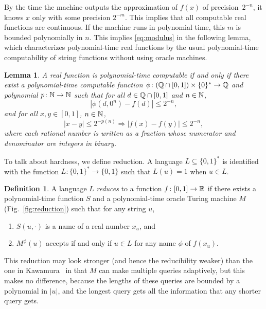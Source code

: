 \documentclass{article}
\newtheorem{lemma}[theorem]{Lemma}
\theoremstyle{definition}
\newtheorem{definition}[theorem]{Definition}
\theoremstyle{remark}
\begin{document}
By the time the machine outputs the approximation of $f (x)$ of precision~$2 ^{-n}$, 
it knows $x$ only with some precision $2 ^{-m}$.
This implies that all computable real functions are continuous.
If the machine runs in polynomial time,
this $m$ is bounded polynomially in $n$.
This implies \eqref{eq:modulus} in the following lemma, 
which characterizes polynomial-time real functions
by the usual polynomial-time computability of string functions 
without using oracle machines. 

\begin{lemma}
 \label{lem:type1representation}
 A real function is polynomial-time computable if and only if
 there exist a polynomial-time computable function 
 $\phi \colon (\mathbb Q \cap [0, 1]) \times \{0\} ^* \to \mathbb Q$ and 
 polynomial $p \colon \mathbb N \to \mathbb N$ such that
 for all $d \in \mathbb Q \cap [0,1]$ and $n \in \mathbb N$,
 \begin{equation}
  |\phi(d, 0^n) - f(d)| \le 2^{-n},
 \end{equation}
 and for all $x, y \in [0, 1]$, $n \in \mathbb N$,
 \begin{equation} 
  |x-y| \le 2^{-p(n)} \Rightarrow |f(x) - f(y)| \le 2^{-n},
   \label{eq:modulus}
 \end{equation}
where each rational number is written
as a fraction whose numerator and denominator
are integers in binary.
\end{lemma}

To talk about hardness, we define reduction. 
A language $L \subseteq \{0, 1\} ^*$ is identified with the function
$L \colon \{0, 1\} ^* \to \{0, 1\}$ such that $L (u) = 1$ when $u \in L$.

\begin{definition} \label{definition: reduction}
 A language $L$ \emph{reduces} to a function $f \colon [0, 1] \to \mathbb R$
 if there exists a polynomial-time function $S$ and a polynomial-time oracle Turing machine $M$ (Fig.~\ref{fig:reduction})
 such that for any string $u$, 
  \begin{enumerate}
   \item $S(u, \cdot)$ is a name of a real number $x_u$, and 
   \item $M^\phi(u)$ accepts if and only if $u \in L$ for any name $\phi$ of $f(x_u)$.
  \end{enumerate}
\end{definition}
This reduction may look stronger (and hence the reducibility weaker) than
the one in Kawamura~\cite{kawamura2010lipschitz} 
in that $M$ can make multiple queries adaptively, 
but this makes no difference, 
because the lengths of these queries 
are bounded by a polynomial in $\lvert u \rvert$, 
and the longest query gets all the information that any shorter query gets. 
\end{document}
